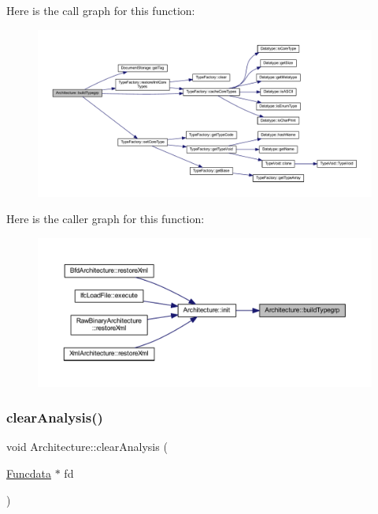 Here is the call graph for this function\+:
\nopagebreak
\begin{figure}[H]
\begin{center}
\leavevmode
\includegraphics[width=350pt]{class_architecture_aaf041374ee649d2c0d8e95e450af5bf9_cgraph}
\end{center}
\end{figure}
Here is the caller graph for this function\+:
\nopagebreak
\begin{figure}[H]
\begin{center}
\leavevmode
\includegraphics[width=350pt]{class_architecture_aaf041374ee649d2c0d8e95e450af5bf9_icgraph}
\end{center}
\end{figure}
\mbox{\label{class_architecture_a5cb912926505aad414d6054071a9e8d8}} 
\subsubsection{\texorpdfstring{clearAnalysis()}{clearAnalysis()}}
{\footnotesize\ttfamily void Architecture\+::clear\+Analysis (\begin{DoxyParamCaption}\item[{\mbox{\hyperlink{class_funcdata}{Funcdata}} $\ast$}]{fd }\end{DoxyParamCaption})}




